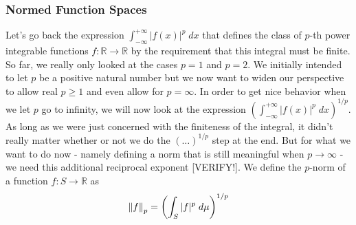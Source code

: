 










\subsubsection{Normed Function Spaces}
Let's go back the expression $\int_{-\infty}^{+\infty} |f(x)|^p \; dx$ that defines the class of $p$-th power integrable functions $f: \mathbb{R} \rightarrow \mathbb{R}$ by the requirement that this integral must be finite. So far, we really only looked at the cases $p=1$ and $p=2$. We initially intended to let $p$ be a positive natural number but we now want to widen our perspective to allow real $p \geq 1$ and even allow for $p = \infty$. In order to get nice behavior when we let $p$ go to infinity, we will now look at the expression $(\int_{-\infty}^{+\infty} |f(x)|^p \; dx)^{1/p}$. As long as we were just concerned with the finiteness of the integral, it didn't really matter whether or not we do the $(\ldots)^{1/p}$ step at the end. But for what we want to do now - namely defining a norm that is still meaningful when $p \rightarrow \infty$ - we need this additional reciprocal exponent [VERIFY!]. We define the $p$-norm of a function $f: S \rightarrow \mathbb{R}$ as
\begin{equation}
 \left\lVert f\right\rVert_p = \left( \int_S |f|^p \; d\mu \right)^{1/p}
\end{equation}


